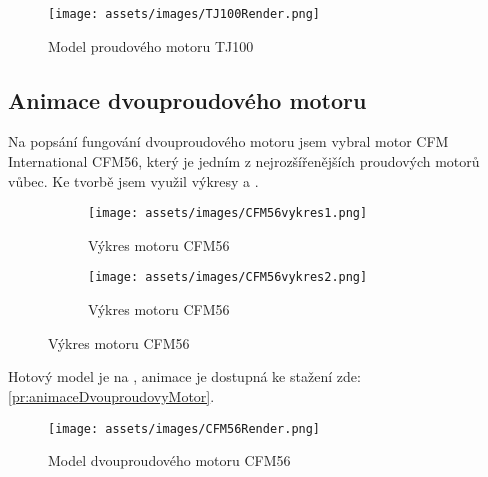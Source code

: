\begin{figure}[H]
    \centering
    \texttt{[image: assets/images/TJ100Render.png]}
    \caption{Model proudového motoru TJ100 \jaObr}
    \label{obr:TJ100Render}
\end{figure}

\newpage

\subsection{Animace dvouproudového motoru}
{Na popsání fungování dvouproudového motoru jsem vybral motor CFM International CFM56, který je jedním z nejrozšířenějších proudových motorů vůbec. Ke tvorbě jsem využil výkresy  a .}
\cite{RG:ReducedOrderModel}\cite{TL:OffDesignPerformancePrediction}

\begin{figure}[H]
    \centering
    \begingroup
    \makeatletter
    \renewcommand\thesubfigure{\thefigure~--~\@nameuse{subfiglabel@\alph{subfigure}}}
    \newcommand{\subfiglabel@a}{vlevo}
    \newcommand{\subfiglabel@b}{vpravo}
    \captionsetup[subfigure]{labelformat=simple, labelsep=colon}
    \renewcommand\p@subfigure{}
    \makeatother
    \begin{subfigure}{.5\textwidth}
        \centering
        \texttt{[image: assets/images/CFM56vykres1.png]}
        \caption{Výkres motoru CFM56}
        \label{obr:CFM56vykres1}
    \end{subfigure}%
    \begin{subfigure}{.5\textwidth}
        \centering
        \texttt{[image: assets/images/CFM56vykres2.png]}
        \caption{Výkres motoru CFM56}
        \label{obr:CFM56vykres2}
    \end{subfigure}
    \endgroup
\end{figure}

{Hotový model je na , animace je dostupná ke stažení zde: \ref{pr:animaceDvouproudovyMotor}.}

\begin{figure}[H]
    \centering
    \texttt{[image: assets/images/CFM56Render.png]}
    \caption{Model dvouproudového motoru CFM56 \jaObr}
    \label{obr:CFM56Render}
\end{figure}